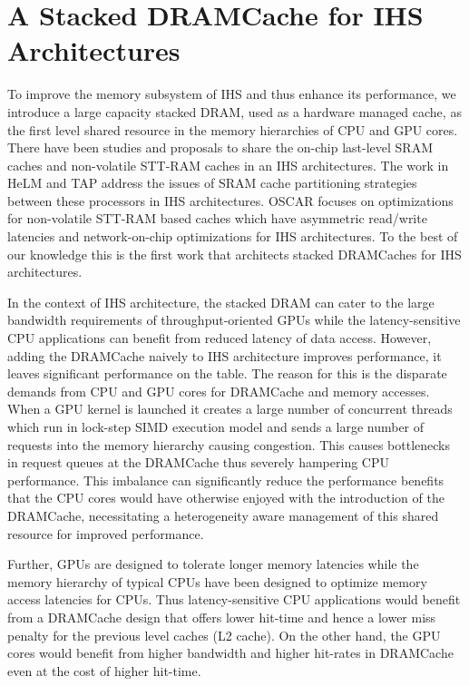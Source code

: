 \section{A Stacked DRAMCache for IHS Architectures}
To improve the memory subsystem of IHS and thus enhance its performance, we introduce a large capacity stacked DRAM, used as a hardware managed cache, as the  first level shared resource in the memory hierarchies of CPU and GPU cores. There have been studies and proposals to share the on-chip last-level SRAM caches \cite{helm,tap} and non-volatile STT-RAM caches \cite{oscar} in an IHS architectures. The work in HeLM \cite{helm} and TAP \cite{tap} address the issues of SRAM cache partitioning strategies between these processors in IHS architectures. OSCAR \cite{oscar} focuses on optimizations for non-volatile STT-RAM based caches which have asymmetric read/write latencies and network-on-chip optimizations for IHS architectures. To the best of our knowledge this is the first work that architects stacked DRAMCaches for IHS architectures.
\par In the context of IHS architecture, the stacked DRAM can cater to the large bandwidth requirements of throughput-oriented GPUs while the latency-sensitive CPU applications can benefit from reduced latency of data access. However, adding the DRAMCache naively to IHS architecture improves performance, it leaves significant performance on the table.  The reason for this is the  disparate demands from CPU and GPU cores for DRAMCache and memory accesses. When a GPU kernel is launched it creates a large number of concurrent threads which run in lock-step SIMD execution model and sends a large number of requests into the memory hierarchy causing congestion. This causes bottlenecks in request queues at the DRAMCache thus severely hampering CPU performance. This imbalance can significantly reduce the performance benefits that the CPU cores would have otherwise enjoyed with the introduction of the DRAMCache, necessitating a heterogeneity aware management of this shared resource for improved performance. 
\par Further, GPUs are designed to tolerate longer memory latencies while the memory hierarchy of typical CPUs have been designed to optimize memory access latencies for CPUs. Thus latency-sensitive CPU applications would benefit from a DRAMCache design that offers lower hit-time and hence a lower miss penalty for the previous level caches (L2 cache). On the other hand, the GPU cores would benefit from higher bandwidth and higher hit-rates in DRAMCache even at the cost of higher hit-time.
